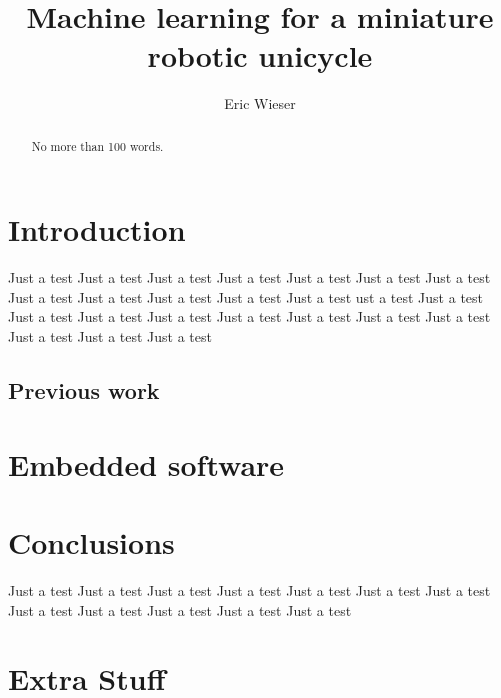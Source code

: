 \documentclass{IIBproject}
\begin{document}
\author{Eric Wieser}
\title{Machine learning for a miniature robotic unicycle}
\maketitle
\thispagestyle{empty}



\begin{abstract}
No more than 100 words.
\end{abstract}
\pagestyle{plain}
\tableofcontents
\newpage

\section{Introduction}
Just a test Just a test Just a test Just a test Just a test Just a test 
Just a test Just a test Just a test Just a test Just a test Just a test 
ust a test Just a test Just a test Just a test Just a test Just a test 
Just a test Just a test Just a test Just a test Just a test Just a test 

\subsection{Previous work}

\section{Embedded software}



\section{Conclusions}
Just a test Just a test Just a test Just a test Just a test Just a test 
Just a test Just a test Just a test Just a test Just a test Just a test 



\appendix

\section{Extra Stuff}
\end{document}

